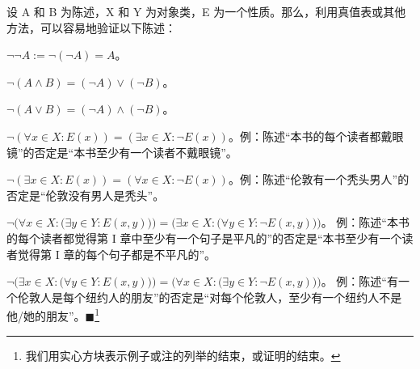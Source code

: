 \begin{example}

设 A 和 B 为陈述，X 和 Y 为对象类，E 为一个性质。那么，利用真值表或其他方法，可以容易地验证以下陈述：

\begin{items}
\item

$ \neg\neg A:=\neg(\neg A)=A $。

\item

$ \neg(A \land B) = (\neg A) \lor (\neg B) $。

\item

$ \neg(A \lor B) = (\neg A) \land (\neg B) $。

\item

$ \neg(\forall x \in X : E(x)) = (\exists x \in X : \neg E(x)) $。例：陈述“本书的每个读者都戴眼镜”的否定是“本书至少有一个读者不戴眼镜”。

\item

$ \neg(\exists x \in X : E(x)) = (\forall x \in X : \neg E(x)) $。例：陈述“伦敦有一个秃头男人”的否定是“伦敦没有男人是秃头”。

\item

$ \neg\bigl(\forall x\in X:\bigl(\exists y\in Y:E(x,y)\bigr)\bigr)=\bigl(\exists x\in X:\bigl(\forall y\in Y:\neg E(x,y)\bigr)\bigr) $。
例：陈述“本书的每个读者都觉得第 I 章中至少有一个句子是平凡的”的否定是“本书至少有一个读者觉得第 I 章的每个句子都是不平凡的”。

\item

$ \neg\bigl(\exists x\in X\colon\bigl(\forall y\in Y\colon E(x,y)\bigr)\bigr)=\bigl(\forall x\in X\colon\bigl(\exists y\in Y\colon\neg E(x,y)\bigr)\bigr) $。
例：陈述“有一个伦敦人是每个纽约人的朋友”的否定是“对每个伦敦人，至少有一个纽约人不是他/她的朋友”。$ \blacksquare $\footnote{我们用实心方块表示例子或注的列举的结束，或证明的结束。}

\end{items}

\end{example}

